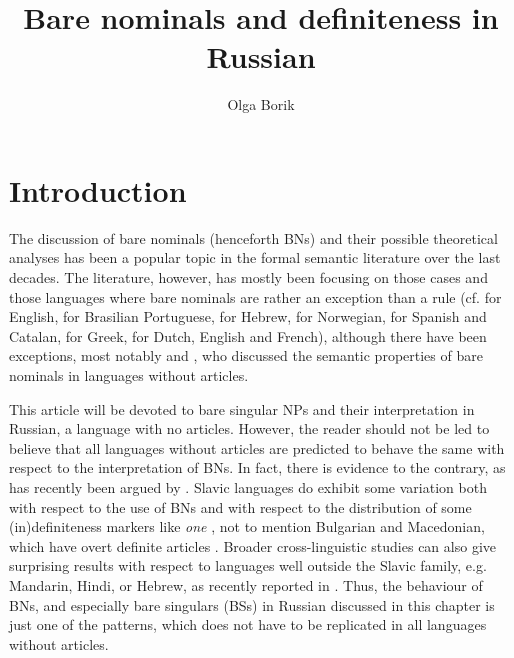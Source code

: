 \documentclass[output=paper,colorlinks,citecolor=brown]{langscibook}
\author{Olga Borik\orcid{0000-0003-1255-5962}\affiliation{Universidad Nacional de Educación a Distancia}}
\title{Bare nominals and definiteness in Russian}
\begin{document}
\maketitle

% 

\section{Introduction}
\label{intro}

The discussion of bare nominals (henceforth BNs) and their possible theoretical analyses has been a popular topic in the formal semantic literature over the last decades. The literature, however,  has mostly been focusing on those cases and those languages where bare nominals are rather an exception than a rule (cf. \citealt{stvandiss} for English, \citealt{munnschmitt05, munnschmitt20} for Brasilian Portuguese, \citealt{doron03} for Hebrew, \citealt{borthen03} for Norwegian, \citealt{espinalmcnally11} for Spanish and Catalan, \citealt{LazaridouAlexandropoulou13} for Greek, \citealt{deswart15} for Dutch, English and French), although there have been exceptions, most notably \citet{dayal04, dayal11} and \citet{munnschmitt20}, who discussed the semantic properties of bare nominals in languages without articles. 

This article will be devoted to bare singular NPs and their interpretation in Russian, a language with no articles. However, the reader should not be led to believe that all languages without articles are predicted to behave the same with respect to the interpretation of BNs. In fact, there is evidence to the contrary, as has recently been argued by \citet{Liu.etal2023, liusalt}. Slavic languages do exhibit some variation both with respect to the use of BNs and with respect to the distribution of some (in)definiteness markers like \textit{one} \citep[see][]{Weiss2004, Geist2013, Hwaszcz.Kedzierska2018, czardybon21, Simik2021}, not to mention Bulgarian and Macedonian, which have overt definite articles \citep[]{Tomić2006, Rudin2021}. Broader cross-linguistic studies can also give surprising results with respect to languages well outside the Slavic family, e.g. Mandarin, Hindi, or Hebrew, as recently reported in \citet{Liu.etal2023, Borik.etal2025, liusalt}. Thus, the behaviour of BNs, and especially bare singulars (BSs) in Russian discussed in this chapter is just one of the patterns, which does not have to be replicated in all languages without articles.
\end{document}
